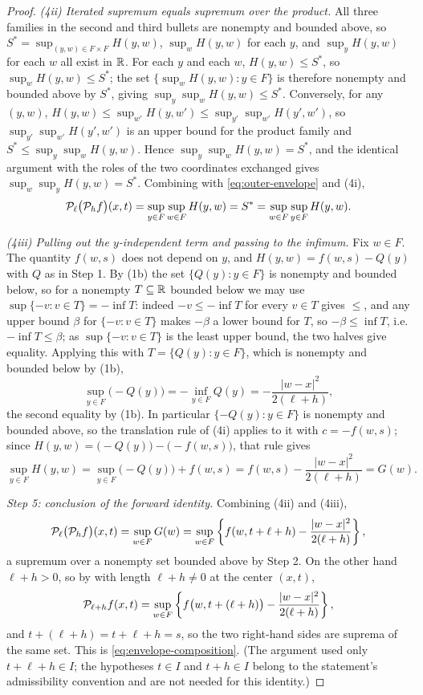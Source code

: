 \begin{proof}
\emph{(4ii) Iterated supremum equals supremum over the product.} All three
families in the second and third bullets are nonempty and bounded above, so
$S^*=\sup_{(y,w)\in F\times F}H(y,w)$, $\sup_{w}H(y,w)$ for each $y$, and
$\sup_{y}H(y,w)$ for each $w$ all exist in $\mathbb{R}$. For each $y$ and each $w$,
$H(y,w)\le S^*$, so $\sup_wH(y,w)\le S^*$; the set
$\{\sup_wH(y,w):y\in F\}$ is therefore nonempty and bounded above by $S^*$,
giving $\sup_y\sup_wH(y,w)\le S^*$. Conversely, for any $(y,w)$,
$H(y,w)\le\sup_{w'}H(y,w')\le\sup_{y'}\sup_{w'}H(y',w')$, so
$\sup_{y'}\sup_{w'}H(y',w')$ is an upper bound for the product family and
$S^*\le\sup_y\sup_wH(y,w)$. Hence
$\sup_y\sup_wH(y,w)=S^*$, and the identical argument with the roles of the two
coordinates exchanged gives $\sup_w\sup_yH(y,w)=S^*$. Combining with
\eqref{eq:outer-envelope} and (4i),
\[
  \mathcal{P}_\ell\bigl(\mathcal{P}_hf\bigr)(x,t)
   =\sup_{y\in F}\sup_{w\in F}H(y,w)=S^*=\sup_{w\in F}\sup_{y\in F}H(y,w).
\]

\emph{(4iii) Pulling out the $y$-independent term and passing to the
infimum.} Fix $w\in F$. The quantity $f(w,s)$ does not depend on $y$, and
$H(y,w)=f(w,s)-Q(y)$ with $Q$ as in Step 1. By (1b) the set $\{Q(y):y\in F\}$
is nonempty and bounded below, so for a nonempty $T\subseteq\mathbb{R}$ bounded below
we may use $\sup\{-v:v\in T\}=-\inf T$: indeed $-v\le-\inf T$ for every
$v\in T$ gives $\le$, and any upper bound $\beta$ for $\{-v:v\in T\}$ makes
$-\beta$ a lower bound for $T$, so $-\beta\le\inf T$, i.e.
$-\inf T\le\beta$; as $\sup\{-v:v\in T\}$ is the least upper bound, the two
halves give equality. Applying this with $T=\{Q(y):y\in F\}$, which is nonempty
and bounded below by (1b),
\[
  \sup_{y\in F}\bigl(-Q(y)\bigr)=-\inf_{y\in F}Q(y)
   =-\frac{|w-x|^2}{2(\ell+h)} ,
\]
the second equality by (1b). In particular $\{-Q(y):y\in F\}$ is nonempty and
bounded above, so the translation rule of (4i) applies to it with
$c=-f(w,s)$; since $H(y,w)=\bigl(-Q(y)\bigr)-\bigl(-f(w,s)\bigr)$, that rule
gives
\[
  \sup_{y\in F}H(y,w)=\sup_{y\in F}\bigl(-Q(y)\bigr)+f(w,s)
   =f(w,s)-\frac{|w-x|^2}{2(\ell+h)}=G(w).
\]

\emph{Step 5: conclusion of the forward identity.}
Combining (4ii) and (4iii),
\[
  \mathcal{P}_\ell\bigl(\mathcal{P}_hf\bigr)(x,t)
   =\sup_{w\in F}G(w)
   =\sup_{w\in F}\left\{f(w,t+\ell+h)-\frac{|w-x|^2}{2(\ell+h)}\right\},
\]
a supremum over a nonempty set bounded above by Step 2. On the other hand
$\ell+h>0$, so by  with length $\ell+h\ne0$ at the center
$(x,t)$,
\[
  \mathcal{P}_{\ell+h}f(x,t)
   =\sup_{w\in F}\left\{f\bigl(w,t+(\ell+h)\bigr)
      -\frac{|w-x|^2}{2(\ell+h)}\right\},
\]
and $t+(\ell+h)=t+\ell+h=s$, so the two right-hand sides are suprema of the
same set. This is \eqref{eq:envelope-composition}. (The argument used only
$t+\ell+h\in I$; the hypotheses $t\in I$ and $t+h\in I$ belong to the
statement's admissibility convention and are not needed for this identity.)


\end{proof}
